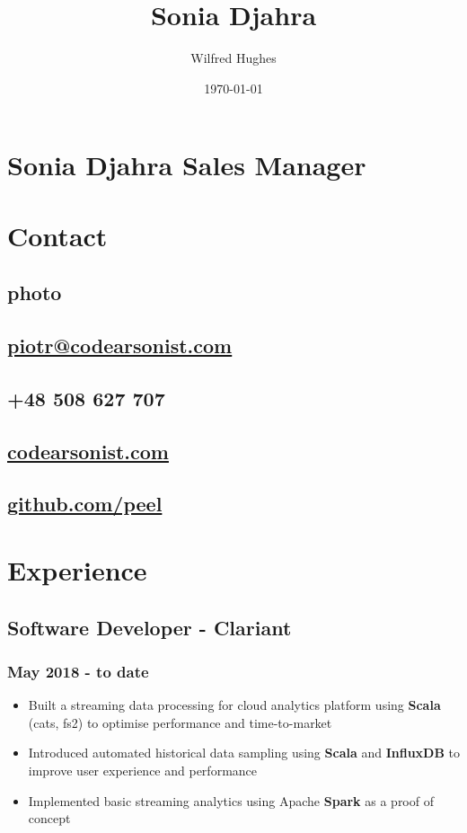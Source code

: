 \documentclass[11pt]{article}
\author{Wilfred Hughes}
\date{\today}
\title{Sonia Djahra}
\begin{document}
\section*{Sonia Djahra Sales Manager}
\label{sec:org083612c}
\section*{Contact}
\label{sec:org851af80}
\subsection*{photo}
\label{sec:org9673dc9}
\subsection*{\href{mailto:piotr@codearsonist.com}{piotr@codearsonist.com}}
\label{sec:org62e1bba}
\subsection*{+48 508 627 707}
\label{sec:org5e46734}
\subsection*{\href{https://codearsonist.com}{codearsonist.com}}
\label{sec:orgc2ed039}
\subsection*{\href{https://github.com/peel}{github.com/peel}}
\label{sec:orgb799654}
\section*{Experience}
\label{sec:org1ae419e}
\subsection*{Software Developer - Clariant}
\label{sec:orgbab041c}
\subsubsection*{May 2018 - to date}
\label{sec:orgffa701e}
\begin{itemize}
\item Built a streaming data processing for cloud analytics platform using \textbf{Scala} (cats, fs2) to optimise performance and time-to-market
\item Introduced automated historical data sampling using \textbf{Scala} and \textbf{InfluxDB} to improve user experience and performance
\item Implemented basic streaming analytics using Apache \textbf{Spark} as a proof of concept
\end{itemize}
\end{document}
